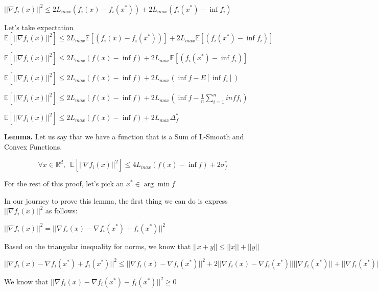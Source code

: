 $ ||\nabla f_i(x)||^2 \leq  2L_{max} (f_i(x) - f_i(x^*)) + 2L_{max} (f_i(x^*) - \inf f_i)$ \newline 

Let's take expectation \newline 
$ \mathbb{E} [||\nabla f_i(x)||^2] \leq  2L_{max} \mathbb{E}[(f_i(x) - f_i(x^*))] + 2L_{max} \mathbb{E}[(f_i(x^*) - \inf f_i)]$ \newline 

$ \mathbb{E} [||\nabla f_i(x)||^2] \leq  2L_{max} (f(x) - \inf f) + 2L_{max} \mathbb{E}[(f_i(x^*) - \inf f_i)]$ \newline 

$ \mathbb{E} [||\nabla f_i(x)||^2] \leq  2L_{max} (f(x) - \inf f) + 2L_{max} (\inf f - E[\inf f_i])$ \newline

$ \mathbb{E} [||\nabla f_i(x)||^2] \leq  2L_{max} (f(x) - \inf f) + 2L_{max} (\inf f - \frac{1}{n} \sum_{i=1}^{n} inf f_i)$ \newline

$ \mathbb{E} [||\nabla f_i(x)||^2] \leq  2L_{max} (f(x) - \inf f) + 2L_{max} \Delta_f^*$ \newline


\noindent \textbf{Lemma. } Let us say that we have a function that is a Sum of L-Smooth and Convex Functions. 

\begin{equation}
\forall x \in \mathbb{R}^d, \enspace \mathbb{E}[||\nabla f_i(x)||^2] \leq 4L_{max} (f(x) - \inf f) + 2\sigma^*_f
\end{equation}

For the rest of this proof, let's pick an $x^* \in \arg \min f$

In our journey to prove this lemma, the first thing we can do is express $||\nabla f_i(x)||^2$ as follows: \newline 

$||\nabla f_i(x)||^2 = ||\nabla f_i(x) - \nabla f_i(x^*) + f_i(x^*)||^2$ \newline 

Based on the triangular inequality for norms, we know that $||x + y|| \leq ||x|| + ||y||$ \newline 

$||\nabla f_i(x) - \nabla f_i(x^*) + f_i(x^*)||^2 \leq ||\nabla f_i(x) - \nabla f_i(x^*)||^2 + 2 ||\nabla f_i(x) - \nabla f_i(x^*)|| ||\nabla f_i(x^*)|| + ||\nabla f_i(x^*)||^2$ \newline 

We know that $||\nabla f_i(x) - \nabla f_i(x^*) - f_i(x^*)||^2 \geq 0$ \newline 

